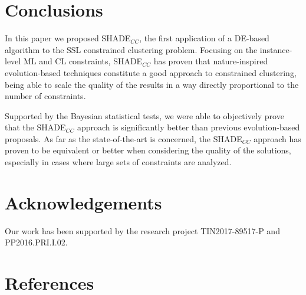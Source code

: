 \documentclass[review]{elsarticle}
\begin{document}
\clearpage

\section{Conclusions} \label{sec:conclusiones}

In this paper we proposed SHADE$_{CC}$, the first application of a DE-based algorithm to the SSL constrained clustering problem. Focusing on the instance-level ML and CL constraints, SHADE$_{CC}$ has proven that nature-inspired evolution-based techniques constitute a good approach to constrained clustering, being able to scale the quality of the results in a way directly proportional to the number of constraints.
 
Supported by the Bayesian statistical tests, we were able to objectively prove that the SHADE$_{CC}$ approach is significantly better than previous evolution-based proposals. As far as the state-of-the-art is concerned, the SHADE$_{CC}$ approach has proven to be equivalent or better when considering the quality of the solutions, especially in cases where large sets of constraints are analyzed.

\section{Acknowledgements}

Our work has been supported by the research project TIN2017-89517-P and PP2016.PRI.I.02.

\clearpage

\section*{References}


\end{document}
